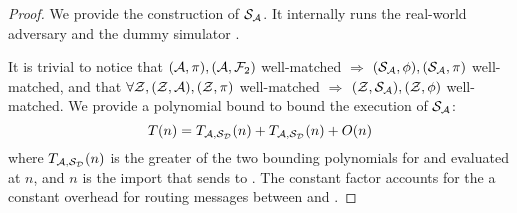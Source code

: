 \begin{proof}
We provide the construction of $\mathcal{S}_\mathcal{A}$.
It internally runs the real-world adversary \Adversary and the dummy simulator \Dummysim. 

It is trivial to notice that $(\mathcal{A}, \pi), (\mathcal{A}, \mathcal{F}_2)$ well-matched $\Rightarrow$ $(\mathcal{S}_\mathcal{A}, \phi), (\mathcal{S}_\mathcal{A}, \pi)$ well-matched, and that $\forall \mathcal{Z}, (\mathcal{Z}, \mathcal{A}), (\mathcal{Z}, \pi)$ well-matched $\Rightarrow$ $(\mathcal{Z}, \mathcal{S}_\mathcal{A}), (\mathcal{Z}, \phi)$ well-matched.
We provide a polynomial bound to bound the execution of $\mathcal{S}_\mathcal{A}$:
\[
T(n) = T_{\mathcal{A},\mathcal{S}_{\mathcal{D}}}(n) + T_{\mathcal{A},\mathcal{S}_{\mathcal{D}}}(n) + O(n)
\]
where $T_{\mathcal{A},\mathcal{S}_{\mathcal{D}}}(n)$ is the greater of the two bounding polynomials for \Dummysim and \Adversary evaluated at $n$, and $n$ is the import that \Environment sends to \Adversary. 
The constant factor accounts for the a constant overhead for routing messages between \Dummysim and \Adversary.




\end{proof}
